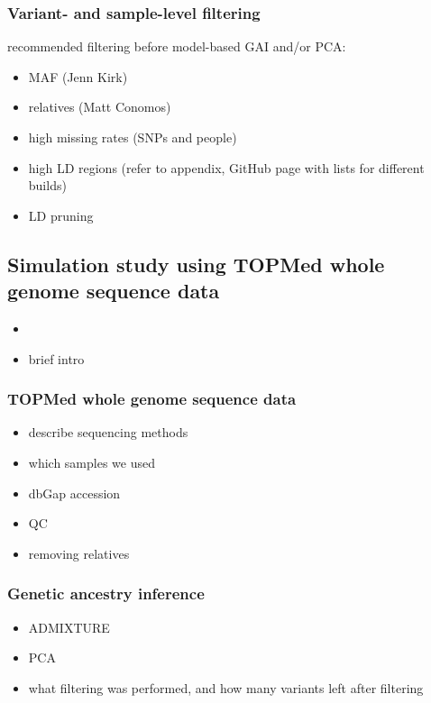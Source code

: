 \documentclass[12pt]{article}
\newcommand{\edit}[1]{{\color{red}{#1}}}
\begin{document}
\subsubsection{Variant- and sample-level filtering}

recommended filtering before model-based GAI and/or PCA:

\begin{itemize}
\item MAF (Jenn Kirk)
\item relatives (Matt Conomos)
\item high missing rates (SNPs and people)
\item high LD regions (refer to appendix, GitHub page with lists for different builds)
\item LD pruning
\end{itemize}



\subsection{Simulation study using TOPMed whole genome sequence data}

\begin{itemize}
\item \edit{Need to decide if we're using TOPMed or WHI data}
\item brief intro
\end{itemize}


\subsubsection{TOPMed whole genome sequence data}

\begin{itemize}
\item describe sequencing methods
\item which samples we used
\item dbGap accession
\item QC
\item removing relatives
\end{itemize}


\subsubsection{Genetic ancestry inference}

\begin{itemize}
\item ADMIXTURE
\item PCA
\item what filtering was performed, and how many variants left after filtering
\end{itemize}
\end{document}
